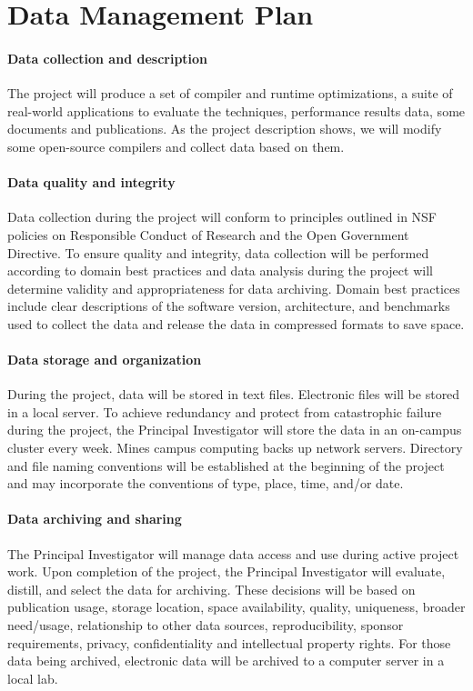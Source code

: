 \section*{Data Management Plan}

\paragraph{Data collection and description}
The project will produce a set of compiler and runtime optimizations, a suite of
real-world applications to evaluate the techniques, performance results data, some
documents and publications. As the project description shows, we will modify some
open-source compilers and collect data based on them.

\paragraph{Data quality and integrity}

Data collection during the project will conform to principles outlined in NSF
policies on Responsible Conduct of Research and the Open Government Directive.
To ensure quality and integrity, data collection will be performed according to
domain best practices and data analysis during the project will determine
validity and appropriateness for data archiving. Domain best practices include
clear descriptions of the software version, architecture, and benchmarks used
to collect the data and release the data in compressed formats to save space.

\paragraph{Data storage and organization}
During the project, data will be stored in text files. Electronic files will be
stored in a local server. To achieve redundancy and protect from catastrophic
failure during the project, the Principal Investigator will store the data in an
on-campus cluster every week. Mines campus computing backs up network servers.
Directory and file naming conventions will be established at the beginning of
the project and may incorporate the conventions of type, place, time, and/or
date.

\paragraph{Data archiving and sharing}
The Principal Investigator will manage data access and use during active project
work. Upon completion of the project, the Principal Investigator will evaluate,
distill, and select the data for archiving. These decisions will be based on
publication usage, storage location, space availability, quality, uniqueness,
broader need/usage, relationship to other data sources, reproducibility, sponsor
requirements, privacy, confidentiality and intellectual property rights. For
those data being archived, electronic data will be archived to a computer server
in a local lab.

